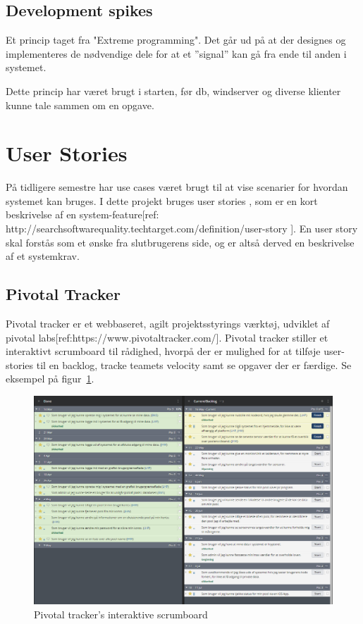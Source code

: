\subsection{Development spikes}
Et princip taget fra "Extreme programming". Det går ud på at der designes og implementeres de nødvendige dele for at et ''signal'' kan gå fra ende til anden i systemet.

Dette princip har været brugt i starten, før \gls{db}, \gls{windserver} og diverse klienter kunne tale sammen om en opgave.

\section{User Stories}
På tidligere semestre har use cases været brugt til at vise scenarier for hvordan systemet kan bruges. I dette projekt bruges user stories \cite{margaretrouse2015}, som er en kort beskrivelse af en system-feature[ref: http://searchsoftwarequality.techtarget.com/definition/user-story ]. En user story skal forstås som et ønske fra slutbrugerens side, og er altså derved en beskrivelse af et systemkrav.

\subsection{Pivotal Tracker}
Pivotal tracker er et webbaseret, agilt projektsstyrings værktøj, udviklet af pivotal labs[ref:https://www.pivotaltracker.com/]. Pivotal tracker stiller et interaktivt scrumboard til rådighed, hvorpå der er mulighed for at tilføje user-stories til en backlog, tracke teamets velocity samt se opgaver der er færdige. Se eksempel på figur~\ref{fig:scrumboard}.

\begin{figure}
	\centering
	\includegraphics[width=\linewidth]{figs/processProjektGennemforsel/scrumboard.PNG}
	\caption{Pivotal tracker's interaktive scrumboard}
	\label{fig:scrumboard}
\end{figure}

